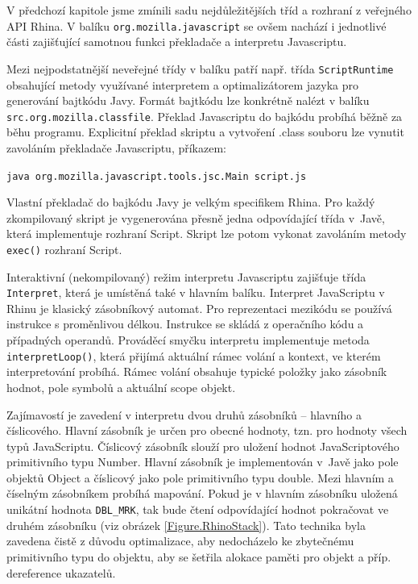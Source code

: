 V předchozí kapitole jsme zmínili sadu nejdůležitějších tříd a rozhraní z veřejného API Rhina. V balíku \texttt{org.mozilla.javascript} se ovšem nachází i jednotlivé části zajišťující samotnou funkci překladače a interpretu Javascriptu.

Mezi nejpodstatnější neveřejné třídy v balíku patří např. třída \texttt{ScriptRuntime} obsahující metody využívané interpretem a optimalizátorem jazyka pro generování bajtkódu Javy. Formát bajtkódu lze konkrétně nalézt v balíku \texttt{src.org.mozilla.classfile}. Překlad Javascriptu do bajkódu probíhá běžně za běhu programu. Explicitní překlad skriptu a vytvoření .class souboru lze vynutit zavoláním překladače Javascriptu, příkazem:

\medskip
\centerline{\texttt{java org.mozilla.javascript.tools.jsc.Main script.js}}
\medskip

Vlastní překladač do bajkódu Javy je velkým specifikem Rhina. Pro každý zkompilovaný skript je vygenerována přesně jedna odpovídající třída v~Javě, která implementuje rozhraní Script. Skript lze potom vykonat zavoláním metody \texttt{exec()} rozhraní Script.

Interaktivní (nekompilovaný) režim interpretu Javascriptu zajišťuje třída \texttt{Interpret}, která je umístěná také v hlavním balíku. Interpret JavaScriptu v Rhinu je klasický zásobníkový automat. Pro reprezentaci mezikódu se používá instrukce s proměnlivou délkou. Instrukce se skládá z operačního kódu a případných operandů. Prováděcí smyčku interpretu implementuje metoda \texttt{interpretLoop()}, která přijímá aktuální rámec volání a kontext, ve kterém interpretování probíhá. Rámec volání obsahuje typické položky jako zásobník hodnot, pole symbolů a aktuální scope objekt.

Zajímavostí je zavedení v interpretu dvou druhů zásobníků -- hlavního a číslicového. Hlavní zásobník je určen pro obecné hodnoty, tzn. pro hodnoty všech typů JavaScriptu. Číslicový zásobník slouží pro uložení hodnot JavaScriptového primitivního typu Number. Hlavní zásobník je implementován v~Javě jako pole objektů Object a číslicový jako pole primitivního typu double. Mezi hlavním a číselným zásobníkem probíhá mapování. Pokud je v hlavním zásobníku uložená unikátní hodnota \texttt{DBL\_MRK}, tak bude čtení odpovídající hodnot pokračovat ve druhém zásobníku (viz obrázek \ref{Figure.RhinoStack}). Tato technika byla zavedena čistě z důvodu optimalizace, aby nedocházelo ke zbytečnému  primitivního typu do objektu, aby se šetřila alokace paměti pro objekt a příp. dereference ukazatelů.

